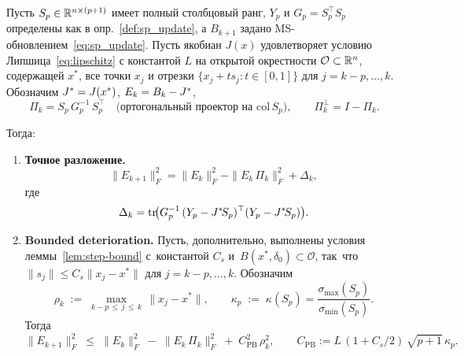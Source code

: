 \begin{theorem}\label{thm:bd}
Пусть $S_p\in\mathbb{R}^{n\times(p+1)}$ имеет полный столбцовый ранг,
$Y_p$ и $G_p = S_p^\top S_p$ определены как в опр.~\ref{def:sp_update},
а $B_{k+1}$ задано MS-обновлением~\eqref{eq:sp_update}. Пусть якобиан
$J(x)$ удовлетворяет условию Липшица~\eqref{eq:lipschitz} с константой
$L$ на открытой окрестности $\mathcal{O}\subset\mathbb{R}^n$, содержащей
$x^{*}$, все точки $x_j$ и отрезки $\{x_j+t s_j : t\in[0,1]\}$ для
$j=k-p,\ldots,k$. Обозначим $J^{*} = J(x^*)$, $E_k = B_k - J^{*}$,
\[
  \Pi_k = S_p\,G_p^{-1}\,S_p^\top \quad\text{(ортогональный проектор на
  $\mathrm{col}\,S_p$)},
  \qquad
  \Pi_k^\perp = I - \Pi_k.
\]

Тогда:

\begin{enumerate}
\item[\textup{(a)}] \textbf{Точное разложение.}
\begin{equation}\label{eq:exact_decomp}
  \|E_{k+1}\|_F^2
  = \|E_k\|_F^2 - \|E_k\,\Pi_k\|_F^2 + \Delta_k,
\end{equation}
где
\begin{equation}\label{eq:Delta_def}
  \Delta_k = \operatorname{tr}\!\bigl(G_p^{-1}\,(Y_p - J^{*}\!S_p)^\top
  (Y_p - J^{*}\!S_p)\bigr).
\end{equation}

\item[\textup{(b)}] \textbf{Bounded deterioration.}
Пусть, дополнительно, выполнены условия леммы~\ref{lem:step-bound}
с~константой $C_s$ и~$B(x^{*},\delta_0)\subset\mathcal{O}$, так~что
$\|s_j\|\le C_s\|x_j-x^{*}\|$ для $j=k-p,\ldots,k$.
Обозначим
\begin{equation}\label{eq:rho-window}
  \rho_k \;:=\; \max_{k-p\,\le\,j\,\le\,k}\,\|x_j - x^{*}\|,
  \qquad
  \kappa_p \;:=\; \kappa(S_p)
  = \frac{\sigma_{\max}(S_p)}{\sigma_{\min}(S_p)}.
\end{equation}
Тогда
\begin{equation}\label{eq:bd_squared}
  \|E_{k+1}\|_F^2 \;\le\; \|E_k\|_F^2 \;-\; \|E_k\,\Pi_k\|_F^2
  \;+\; C_{\mathrm{PB}}^2\,\rho_k^2,
  \qquad
  C_{\mathrm{PB}} := L\,(1 + C_s/2)\,\sqrt{p+1}\,\kappa_p.
\end{equation}
\end{enumerate}
\end{theorem}

